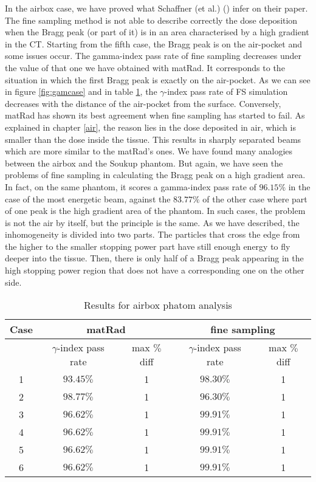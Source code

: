 \documentclass[12pt, a4paper, twoside]{book}
\begin{document}
In the airbox case, we have proved what Schaffner (et al.) (\cite{schaf:pba}) infer on their paper. The fine sampling method is not able to describe correctly the dose deposition when the Bragg peak (or part of it) is in an area characterised by a high gradient in the CT. Starting from the fifth case, the Bragg peak is on the air-pocket and some issues occur. The gamma-index pass rate of fine sampling decreases under the value of that one we have obtained with matRad. It corresponds to the situation in which the first Bragg peak is exactly on the air-pocket. As we can see in figure \ref{fig:gamcase} and in table \ref{tab:air}, the $\gamma$-index pass rate of FS simulation decreases with the distance of the air-pocket from the surface. Conversely, matRad has shown its best agreement when fine sampling has started to fail. As explained in chapter \ref{air}, the reason lies in the dose deposited in air, which is smaller than the dose inside the tissue. This results in sharply separated beams which are more similar to the matRad's ones. We have found many analogies between the airbox and the Soukup phantom. But again, we have seen the problems of fine sampling in calculating the Bragg peak on a high gradient area. In fact, on the same phantom, it scores a gamma-index pass rate of $96.15\%$ in the case of the most energetic beam, against the $83.77\%$ of the other case where part of one peak is the high gradient area of the phantom. In such cases, the problem is not the air by itself, but the principle is the same.
As we have described, the inhomogeneity is divided into two parts. The particles that cross the edge from the higher to the smaller stopping power part have still enough energy to fly deeper into the tissue. Then, there is only half of a Bragg peak appearing in the high stopping power region that does not have a corresponding one on the other side.

\begin{table}[t]
\centering
\begin{tabular}{ccccc}
\toprule
Case & \multicolumn{2}{c}{matRad} & \multicolumn{2}{c}{fine sampling}\\
\midrule
 & $\gamma$-index pass rate & max $\%$ diff & $\gamma$-index pass rate & max $\%$ diff\\
\midrule
1 & $93.45\%$ & 1 & $98.30\%$ &1\\
2 & $98.77\%$ & 1 & $96.30\%$ &1\\
3 & $96.62\%$ & 1 & $99.91\%$ &1\\
4 & $96.62\%$ & 1 & $99.91\%$ &1\\
5 & $96.62\%$ & 1 & $99.91\%$ &1\\
6 & $96.62\%$ & 1 & $99.91\%$ &1\\
\bottomrule
\end{tabular}
\label{tab:air}
\caption{Results for airbox phatom analysis}
\end{table}
\end{document}
